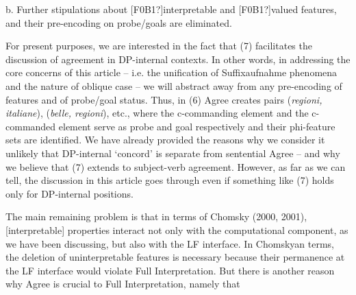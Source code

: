 \documentclass[output=paper]{langsci/langscibook}
\begin{document}
\begin{styleSfondomedioiColorexxi}
b.  Further stipulations about [F0B1?]interpretable and [F0B1?]valued features, and their pre-encoding on probe/goals \citep{Chomsky2001} are eliminated.  
\end{styleSfondomedioiColorexxi}

For present purposes, we are interested in the fact that (7) facilitates the discussion of agreement in DP-internal contexts. In other words, in addressing the core concerns of this article – i.e. the unification of Suffixaufnahme phenomena and the nature of oblique case – we will abstract away from any pre-encoding of features and of probe/goal status. Thus, in (6) Agree creates pairs (\textit{regioni, italiane}), (\textit{belle, regioni}), etc., where the c-commanding element and the c-commanded element serve as probe and goal respectively and their phi-feature sets are identified. We have already provided the reasons why we consider it unlikely that DP-internal ‘concord’ is separate from sentential Agree – and why we believe that (7) extends to subject-verb agreement. However, as far as we can tell, the discussion in this article goes through even if something like (7) holds only for DP-internal positions. 

The main remaining problem is that in terms of Chomsky (2000, 2001), [interpretable] properties interact not only with the computational component, as we have been discussing, but also with the LF interface. In Chomskyan terms, the deletion of uninterpretable features is necessary because their permanence at the LF interface would violate Full Interpretation. But there is another reason why Agree is crucial to Full Interpretation, namely that 
\end{document}
